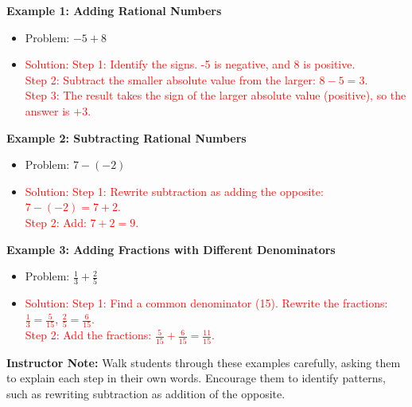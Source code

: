 \documentclass[12pt]{article}
\begin{document}
\begin{tcolorbox}[colframe=black!60, colback=white, 
coltitle=black, colbacktitle=black!15, fonttitle=\bfseries\Large, 
title=Examples, halign title=center, left=10pt, right=10pt, top=10pt, bottom=15pt]
\textbf{Example 1: Adding Rational Numbers}
\begin{itemize}
    \item Problem: \( -5 + 8 \)
    \item \textcolor{red}{Solution: Step 1: Identify the signs. -5 is negative, and 8 is positive.\\ 
    Step 2: Subtract the smaller absolute value from the larger: \( 8 - 5 = 3 \).\\
    Step 3: The result takes the sign of the larger absolute value (positive), so the answer is \( +3 \).}
\end{itemize}

\textbf{Example 2: Subtracting Rational Numbers}
\begin{itemize}
    \item Problem: \( 7 - (-2) \)
    \item \textcolor{red}{Solution: Step 1: Rewrite subtraction as adding the opposite: \( 7 - (-2) = 7 + 2 \).\\
    Step 2: Add: \( 7 + 2 = 9 \).}
\end{itemize}

\textbf{Example 3: Adding Fractions with Different Denominators}
\begin{itemize}
    \item Problem: \( \frac{1}{3} + \frac{2}{5} \)
    \item \textcolor{red}{Solution: Step 1: Find a common denominator (15). Rewrite the fractions: \( \frac{1}{3} = \frac{5}{15} \), \( \frac{2}{5} = \frac{6}{15} \).\\
    Step 2: Add the fractions: \( \frac{5}{15} + \frac{6}{15} = \frac{11}{15} \).}
\end{itemize}

{\color{blue} \textbf{Instructor Note:} Walk students through these examples carefully, asking them to explain each step in their own words. Encourage them to identify patterns, such as rewriting subtraction as addition of the opposite.}
\end{tcolorbox}

\vspace{1em}
\end{document}
